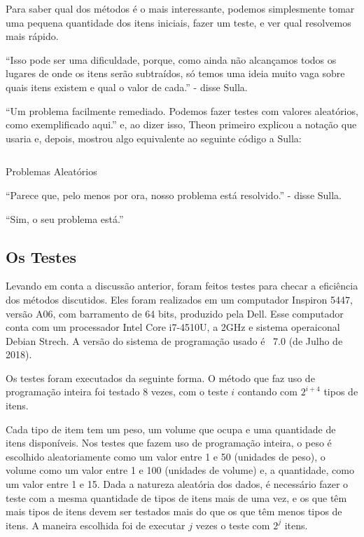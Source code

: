 Para saber qual dos métodos é o mais interessante, podemos
simplesmente tomar uma pequena quantidade dos itens iniciais, fazer
um teste, e ver qual resolvemos mais rápido.

``Isso pode ser uma dificuldade, porque, como ainda não alcançamos
todos os lugares de onde os itens serão subtraídos, só temos uma
ideia muito vaga sobre quais itens existem e qual o valor de cada.''
- disse Sulla.

``Um problema facilmente remediado. Podemos fazer testes com valores
aleatórios, como exemplificado aqui.'' e, ao dizer isso, Theon
primeiro explicou a notação que usaria e, depois, mostrou algo
equivalente ao seguinte código a Sulla:

\begin{listing}[H]
  \inputminted{prolog}{../Exemplos/Cap12/test/random.ecl}
  \caption{Problemas Aleatórios}\label{lst:random}
\end{listing}

``Parece que, pelo menos por ora, nosso problema está resolvido.'' -
disse Sulla.

``Sim, o seu problema está.''

\subsection{Os Testes}

Levando em conta a discussão anterior, foram feitos testes para
checar a eficiência dos métodos discutidos. Eles foram realizados em
um computador Inspiron 5447, versão A06, com barramento de 64 bits,
produzido pela Dell. Esse computador conta com um processador Intel
Core i7-4510U, a 2GHz e sistema operaiconal Debian Strech. A versão do
sistema de programação usado é \eclipse\ 7.0 (de Julho de 2018). 

Os testes foram executados da seguinte forma. O método que faz uso de
programação inteira foi testado 8 vezes, com o teste $i$ contando
com $2^{i+4}$ tipos de itens.

Cada tipo de item tem um peso, um volume que ocupa e uma quantidade
de itens disponíveis. Nos testes que fazem uso de programação
inteira, o peso é escolhido aleatoriamente como um valor entre 1 e
50 (unidades de peso), o volume como um valor entre 1 e 100
(unidades de volume) e, a quantidade, como um valor entre 1 e
15. Dada a natureza aleatória dos dados, é necessário fazer o
teste com a mesma quantidade de tipos de itens mais de uma vez, e os
que têm mais tipos de itens devem ser testados mais do que os que
têm menos tipos de itens. A maneira escolhida foi de executar $j$ vezes
o teste com $2^j$ itens.

